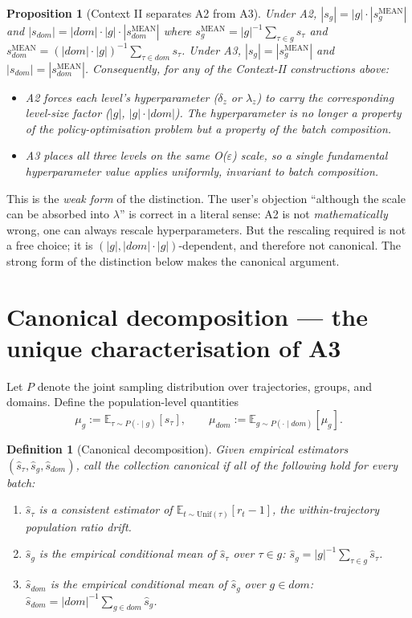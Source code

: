 \documentclass[11pt]{article}
\newcommand{\smean}{s^{\text{MEAN}}}
\newtheorem{definition}{Definition}
\newtheorem{proposition}{Proposition}
\begin{document}
\begin{proposition}[Context II separates A2 from A3]
\label{prop:ctx2}
Under A2, $|s_g| = |g|\cdot|\smean_g|$ and $|s_{dom}| = |dom|\cdot|g|\cdot|\smean_{dom}|$
where $\smean_g = |g|^{-1}\sum_{\tau\in g}s_\tau$ and
$\smean_{dom} = (|dom|\cdot|g|)^{-1}\sum_{\tau\in dom}s_\tau$. Under A3,
$|s_g| = |\smean_g|$ and $|s_{dom}| = |\smean_{dom}|$. Consequently, for
any of the Context-II constructions above:
\begin{itemize}
\item A2 forces each level's hyperparameter ($\delta_z$ or $\lambda_z$) to
carry the corresponding level-size factor ($|g|$, $|g|\cdot|dom|$). The
hyperparameter is no longer a property of the policy-optimisation problem
but a property of the \emph{batch composition}.
\item A3 places all three levels on the same O($\varepsilon$) scale, so a
single fundamental hyperparameter value applies uniformly, invariant to
batch composition.
\end{itemize}
\end{proposition}

This is the \emph{weak form} of the distinction. The user's objection
``although the scale can be absorbed into $\lambda$'' is correct in a
literal sense: A2 is not \emph{mathematically} wrong, one can always
rescale hyperparameters. But the rescaling required is not a free choice;
it is $(|g|, |dom|\cdot|g|)$-dependent, and therefore not canonical. The
strong form of the distinction below makes the canonical argument.

\section{Canonical decomposition --- the unique characterisation of A3}

Let $P$ denote the joint sampling distribution over trajectories, groups,
and domains. Define the population-level quantities
\[
\mu_g := \mathbb{E}_{\tau\sim P(\cdot\mid g)}[s_\tau], \qquad
\mu_{dom} := \mathbb{E}_{g\sim P(\cdot\mid dom)}[\mu_g].
\]

\begin{definition}[Canonical decomposition]
\label{def:canonical}
Given empirical estimators $(\widehat s_\tau,\widehat s_g,\widehat s_{dom})$,
call the collection \emph{canonical} if all of the following hold for
every batch:
\begin{enumerate}
\item[(C1)] $\widehat s_\tau$ is a consistent estimator of
$\mathbb{E}_{t\sim\text{Unif}(\tau)}[r_t - 1]$, the within-trajectory
population ratio drift.
\item[(C2)] $\widehat s_g$ is the empirical conditional mean of
$\widehat s_\tau$ over $\tau\in g$: $\widehat s_g = |g|^{-1}\sum_{\tau\in g}\widehat s_\tau$.
\item[(C3)] $\widehat s_{dom}$ is the empirical conditional mean of
$\widehat s_g$ over $g\in dom$: $\widehat s_{dom} = |dom|^{-1}\sum_{g\in dom}\widehat s_g$.
\end{enumerate}
\end{definition}
\end{document}
